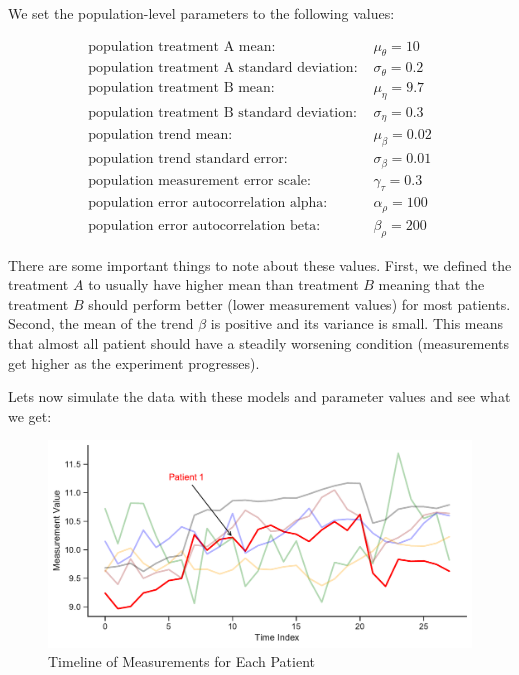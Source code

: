 \documentclass[12pt,a4paper,leqno]{report}
\theoremstyle{plain}
\theoremstyle{definition}
\theoremstyle{remark}
\begin{document}
We set the population-level parameters to the following values:

\begin{align}\label{populationparameters}
    \text{population treatment A mean: } & \mu_{\theta} = 10 \nonumber \\
    \text{population treatment A standard deviation: } & \sigma_{\theta} = 0.2 \nonumber \\
    \text{population treatment B mean: } & \mu_{\eta} = 9.7 \nonumber \\
    \text{population treatment B standard deviation: } & \sigma_{\eta} = 0.3 \nonumber \\
    \text{population trend mean: } & \mu_{\beta} = 0.02 \nonumber \\
    \text{population trend standard error: } & \sigma_{\beta} = 0.01 \nonumber \\
    \text{population measurement error scale: } & \gamma_{\tau} = 0.3 \nonumber \\
    \text{population error autocorrelation alpha: } & \alpha_{\rho} = 100 \nonumber \\
    \text{population error autocorrelation beta: } & \beta_{\rho} = 200 \nonumber
\end{align}

There are some important things to note about these values. First, we defined the
treatment \(A\) to usually have higher mean than treatment \(B\) meaning that the
treatment \(B\) should perform better (lower measurement values) for most patients.
Second, the mean of the trend \(\beta \) is positive and its variance is small. This means
that almost all patient should have a steadily worsening condition (measurements get
higher as the experiment progresses).

Lets now simulate the data with these models and parameter values and see what we get:


\begin{figure}[!h]
    \caption{Timeline of Measurements for Each Patient}
    \includegraphics[width=\textwidth,height=\textheight,keepaspectratio]{measurements_timeline.pdf}
\end{figure}
\end{document}
